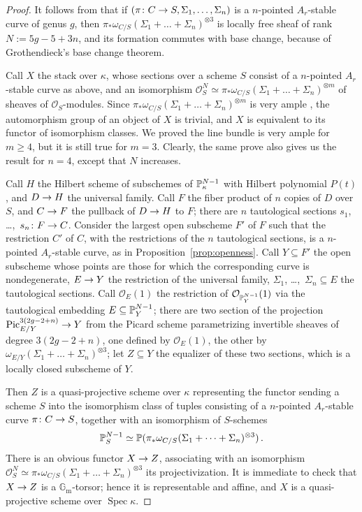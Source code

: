 \documentclass{alggeom}
\numberwithin{equation}{section}
\numberwithin{subsection}{section}
\theoremstyle{definition}
\theoremstyle{remark}
\newcommand\cO{\mathcal{O}} \newcommand\cP{\mathcal{P}}
\newcommand\GG{\mathbb{G}} \newcommand\HH{\mathbb{H}}
\newcommand\rmm{\mathrm{m}} \newcommand\rmn{\mathrm{n}}
\newcommand\arr{\ifinner\to\else\longrightarrow\fi}
\newcommand\pic{\operatorname{Pic}}
\newcommand\spec{\operatorname{Spec}}
\newcommand{\gm}{\GG_{\rmm}}
\begin{document}
\begin{proof}
	It follows from  that if $(\pi\colon C \arr S,\Sigma_1,\dots,\Sigma_n)$ is a $n$-pointed $A_{r}$-stable curve of genus $g$, then $\pi_{*}\omega_{C/S}(\Sigma_{1}+ \dots + \Sigma_{n})^{\otimes 3}$ is locally free sheaf of rank $N:=5g-5+3n$, and its formation commutes with base change, because of Grothendieck's base change theorem. 
	
	Call $X$ the stack over $\kappa$, whose sections over a scheme $S$ consist of a $n$-pointed  $A_{r}$-stable curve as above, and an isomorphism $\cO_{S}^{N} \simeq \pi_{*}\omega_{C/S}(\Sigma_{1}+ \dots + \Sigma_{n})^{\otimes m}$ of sheaves of $\cO_{S}$-modules. Since $\pi_{*}\omega_{C/S}(\Sigma_{1}+ \dots + \Sigma_{n})^{\otimes m}$ is very ample , the automorphism group of an object of $X$ is trivial, and $X$ is equivalent to its functor of isomorphism classes. We proved the line bundle is very ample for $m\geq 4$, but it is still true for $m=3$. Clearly, the same prove also gives us the result for $n=4$, except that $N$ increases.
	
	Call $H$ the Hilbert scheme of subschemes of $\mathbb{P}^{N-1}_{\kappa}$ with Hilbert polynomial $P(t)$, and $D \arr H$ the universal family. Call $F$ the fiber product of $n$ copies of $D$ over $S$, and $C \arr F$ the pullback of $D \arr H$ to $F$; there are $n$ tautological sections $s_{1}$, \dots,~$s_{n}\colon F \arr C$. Consider the largest open subscheme $F'$ of $F$ such that the restriction $C'$ of $C$, with the restrictions of the $n$ tautological sections, is a $n$-pointed $A_{r}$-stable curve, as in Proposition~\ref{prop:openness}. Call $Y \subseteq F'$ the open subscheme whose points are those for which the corresponding curve is nondegenerate, $E \arr Y$ the restriction of the universal family, $\Sigma_{1}$, \dots,~$\Sigma_{n} \subseteq E$ the tautological sections. Call $\cO_{E}(1)$ the restriction of $\cO_{\PP^{N-1}_{Y}}(1)$ via the tautological embedding $E \subseteq \mathbb{P}^{N-1}_{Y}$; there are two section of the projection $\pic_{E/Y}^{3(2g-2 + n)}\arr Y$ from the Picard scheme parametrizing invertible sheaves of degree $3(2g-2 + n)$, one defined by $\cO_{E}(1)$, the other by $\omega_{E/Y}(\Sigma_{1} + \dots + \Sigma_{n})^{\otimes 3}$; let $Z \subseteq Y$ the equalizer of these two sections, which is a locally closed subscheme of $Y$.
	
	Then $Z$ is a quasi-projective scheme over $\kappa$ representing the functor sending a scheme $S$ into the isomorphism class of tuples consisting of a $n$-pointed  $A_{r}$-stable curve $\pi\colon C \arr S$, together with an isomorphism of $S$-schemes
	\[
	\mathbb{P}^{N-1}_{S} \simeq \mathbb{P}(\pi_{*}\omega_{C/S}(\Sigma_{1} + \dots + \Sigma_{n})^{\otimes 3})\,.
	\]
	There is an obvious functor $X \arr Z$, associating with an isomorphism $\cO_{S}^{N} \simeq \pi_{*}\omega_{C/S}(\Sigma_{1}+ \dots + \Sigma_{n})^{\otimes 3}$ its projectivization. It is immediate to check that $X \arr Z$ is a $\gm$-torsor; hence it is representable and affine, and $X$ is a quasi-projective scheme over $\spec \kappa$.
	

\end{proof}
\end{document}
